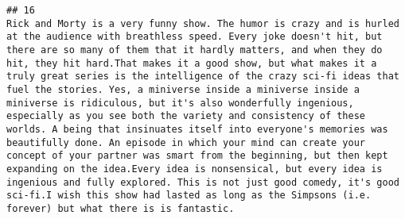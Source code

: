 \documentclass[
]{article}
\begin{document}
\begin{verbatim}
## 16                                                                                                                                                                                                                                                                                                                                                                                                                                                                                                                                                                                                                                                                                                                                                                                                                                                                                                                                                                                                                                                                                                                                                                                                                                                                                                                                                                                                                                         Rick and Morty is a very funny show. The humor is crazy and is hurled at the audience with breathless speed. Every joke doesn't hit, but there are so many of them that it hardly matters, and when they do hit, they hit hard.That makes it a good show, but what makes it a truly great series is the intelligence of the crazy sci-fi ideas that fuel the stories. Yes, a miniverse inside a miniverse inside a miniverse is ridiculous, but it's also wonderfully ingenious, especially as you see both the variety and consistency of these worlds. A being that insinuates itself into everyone's memories was beautifully done. An episode in which your mind can create your concept of your partner was smart from the beginning, but then kept expanding on the idea.Every idea is nonsensical, but every idea is ingenious and fully explored. This is not just good comedy, it's good sci-fi.I wish this show had lasted as long as the Simpsons (i.e. forever) but what there is is fantastic.

\end{verbatim}
\end{document}
